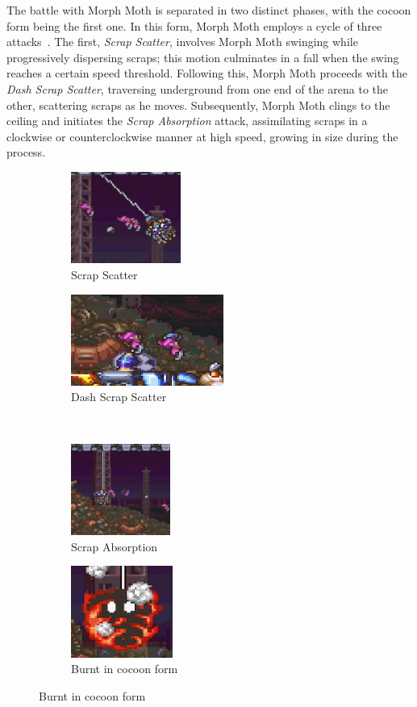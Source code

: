 The battle with Morph Moth is separated in two distinct phases, with the cocoon form being the first one. In this form, Morph Moth employs a cycle of three attacks~\cite{book:Compendium}. The first, \emph{Scrap Scatter}, involves Morph Moth swinging while progressively dispersing scraps; this motion culminates in a fall when the swing reaches a certain speed threshold. Following this, Morph Moth proceeds with the \emph{Dash Scrap Scatter}, traversing underground from one end of the arena to the other, scattering scraps as he moves. Subsequently, Morph Moth clings to the ceiling and initiates the \emph{Scrap Absorption} attack, assimilating scraps in a clockwise or counterclockwise manner at high speed, growing in size during the process. 
\begin{figure}[htp]
	\centering
	\begin{subfigure}{0.3\linewidth}
		\centering
		\includegraphics[height=3cm]{figures/X2/Morph_moth/Moth_swing.jpg}
		\caption{Scrap Scatter}
	\end{subfigure}
	\begin{subfigure}{0.45\linewidth}
		\centering
		\includegraphics[height=3cm]{figures/X2/Morph_moth/Moth_underground.jpg}
		\caption{Dash Scrap Scatter}
	\end{subfigure}\\
	\begin{subfigure}{0.3\linewidth}
		\centering
		\includegraphics[height=3cm]{figures/X2/Morph_moth/Moth_absorb.jpg}
		\caption{Scrap Absorption}
	\end{subfigure}
	\begin{subfigure}{0.3\linewidth}
		\centering
		\includegraphics[height=3cm]{figures/X2/Morph_moth/Moth_burn.jpg}
		\caption{Burnt in cocoon form}
	\end{subfigure}
\end{figure}

